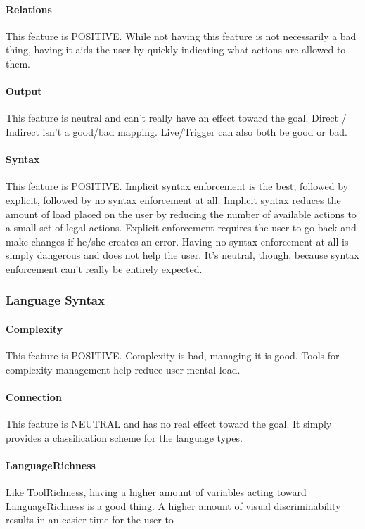 \paragraph{Relations} This feature is POSITIVE. While not having this
feature is not necessarily a bad thing, having it aids the user by quickly
indicating what actions are allowed to them.

\paragraph{Output} This feature is neutral and can't really have an effect
toward the goal. Direct / Indirect isn't a good/bad mapping. Live/Trigger
can also both be good or bad.

\paragraph{Syntax} This feature is POSITIVE. Implicit syntax enforcement is
the best, followed by explicit, followed by no syntax enforcement at all.
Implicit syntax reduces the amount of load placed on the user by reducing
the number of available actions to a small set of legal actions. Explicit
enforcement requires the user to go back and make changes if he/she creates
an error. Having no syntax enforcement at all is simply dangerous and does
not help the user. It's neutral, though, because syntax enforcement can't
really be entirely expected.


\subsubsection{Language Syntax}

\paragraph{Complexity} This feature is POSITIVE. Complexity is bad,
managing it is good. Tools for complexity management help reduce user
mental load.

\paragraph{Connection} This feature is NEUTRAL and has no real effect
toward the goal. It simply provides a classification scheme for the
language types.

\paragraph{LanguageRichness} Like ToolRichness, having a higher amount of
variables acting toward LanguageRichness is a good thing. A higher amount
of visual discriminability results in an easier time for the user to


